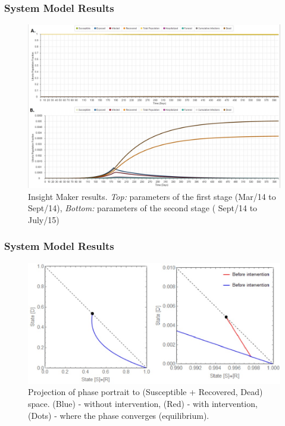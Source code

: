 \documentclass[30pt]{beamer}
\begin{document}
\begin{frame}
\frametitle{System Model Results}
\begin{figure}[!h]
  \centering
  \includegraphics[width=1\textwidth]{LB_Int3_SD_IM}
  \caption{ Insight Maker results. \textit{Top:} parameters of the first stage (Mar/14 to Sept/14), \textit{Bottom:} parameters of the second stage ( Sept/14 to July/15)}
\label{fig:LB_IM_In} 
\end{figure}
\end{frame}

\begin{frame}
\frametitle{System Model Results}
\begin{figure}[!h]
  \centering
  \includegraphics[width=1\textwidth]{PhasePortrait}
  \caption{ Projection of phase portrait to (Susceptible + Recovered, Dead) space. (Blue) - without intervention,
(Red) - with intervention, (Dots) - where the phase converges (equilibrium).}

\end{figure}
\end{frame}
\end{document}
